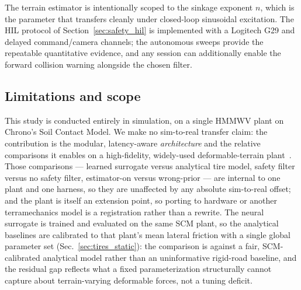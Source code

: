 \documentclass[conference,letterpaper,10pt]{IEEEtran}
\begin{document}
The terrain estimator is intentionally scoped to the sinkage exponent
$n$, which is the parameter that transfers cleanly under closed-loop
sinusoidal excitation. The HIL protocol of
Section~\ref{sec:safety_hil} is implemented with a Logitech G29 and
delayed command/camera channels; the autonomous sweeps provide the
repeatable quantitative evidence, and any session can additionally
enable the forward collision warning alongside the chosen filter.

\subsection{Limitations and scope}
\label{sec:limitations}
This study is conducted entirely in simulation, on a single HMMWV plant
on Chrono's Soil Contact Model. We make no sim-to-real transfer claim:
the contribution is the modular, latency-aware \emph{architecture} and
the relative comparisons it enables on a high-fidelity, widely-used
deformable-terrain plant~\cite{Krenn09,Tasora16}. Those comparisons ---
learned surrogate versus analytical tire model, safety filter versus no safety filter,
estimator-on versus wrong-prior --- are internal to one plant and one
harness, so they are unaffected by any absolute sim-to-real offset; and
the plant is itself an extension point, so porting to hardware or another
terramechanics model is a registration rather than a rewrite. The
neural surrogate is trained and evaluated on the same SCM plant, so the
analytical baselines are calibrated to that plant's mean lateral
friction with a single global parameter set
(Sec.~\ref{sec:tires_static}): the comparison is against a fair,
SCM-calibrated analytical model rather than an uninformative rigid-road baseline, and
the residual gap reflects what a fixed parameterization structurally
cannot capture about terrain-varying deformable forces, not a tuning
deficit.
\end{document}
